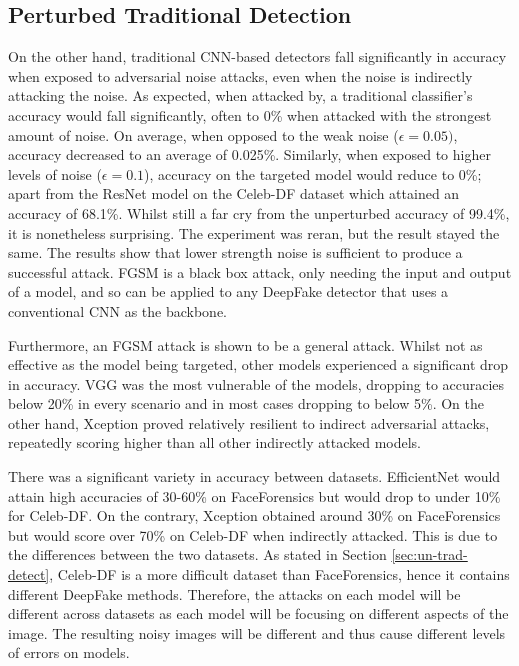 \subsection{Perturbed Traditional Detection}

On the other hand, traditional CNN-based detectors fall significantly in accuracy when exposed to adversarial noise attacks, even when the noise is indirectly attacking the noise. As expected, when attacked by, a traditional classifier's accuracy would fall significantly, often to 0\% when attacked with the strongest amount of noise. On average, when opposed to the weak noise ($\epsilon=0.05)$, accuracy decreased to an average of 0.025\%. Similarly, when exposed to higher levels of noise ($\epsilon=0.1$), accuracy on the targeted model would reduce to 0\%; apart from the ResNet model on the Celeb-DF dataset which attained an accuracy of 68.1\%. Whilst still a far cry from the unperturbed accuracy of 99.4\%, it is nonetheless surprising. The experiment was reran, but the result stayed the same. The results show that lower strength noise is sufficient to produce a successful attack. FGSM is a black box attack, only needing the input and output of a model, and so can be applied to any DeepFake detector that uses a conventional CNN as the backbone.

Furthermore, an FGSM attack is shown to be a general attack. Whilst not as effective as the model being targeted, other models experienced a significant drop in accuracy. VGG was the most vulnerable of the models, dropping to accuracies below 20\% in every scenario and in most cases dropping to below 5\%. On the other hand, Xception proved relatively resilient to indirect adversarial attacks, repeatedly scoring higher than all other indirectly attacked models.

There was a significant variety in accuracy between datasets. EfficientNet would attain high accuracies of 30-60\% on FaceForensics but would drop to under 10\% for Celeb-DF. On the contrary, Xception obtained around 30\% on FaceForensics but would score over 70\% on Celeb-DF when indirectly attacked. This is due to the differences between the two datasets. As stated in Section \ref{sec:un-trad-detect}, Celeb-DF is a more difficult dataset than FaceForensics, hence it contains different DeepFake methods. Therefore, the attacks on each model will be different across datasets as each model will be focusing on different aspects of the image. The resulting noisy images will be different and thus cause different levels of errors on models.

